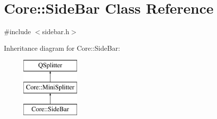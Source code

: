 \hypertarget{class_core_1_1_side_bar}{\section{Core\-:\-:Side\-Bar Class Reference}
\label{class_core_1_1_side_bar}
}


{\ttfamily \#include $<$sidebar.\-h$>$}

Inheritance diagram for Core\-:\-:Side\-Bar\-:\begin{figure}[H]
\begin{center}
\leavevmode
\includegraphics[height=3.000000cm]{class_core_1_1_side_bar}
\end{center}
\end{figure}
